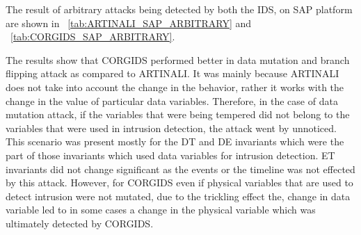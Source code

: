 The result of arbitrary attacks being detected by both the IDS, on SAP platform are shown in ~\autoref{tab:ARTINALI_SAP_ARBITRARY} and ~\autoref{tab:CORGIDS_SAP_ARBITRARY}.

\begin{table}
\centering
  \caption{Results of intrusion detection by ARTINALI for Arbitrary attacks on SAP platform}
  \label{tab:ARTINALI_SAP_ARBITRARY}
\end{table}


\begin{table}
\centering
  \caption{Results of intrusion detection by CORGIDS for Arbitrary attacks on SAP platform}
  \label{tab:CORGIDS_SAP_ARBITRARY}
\end{table}

The results show that CORGIDS performed better in data mutation and branch flipping attack as compared to ARTINALI. It was mainly because ARTINALI does not take into account the change in the behavior, rather it works with the change in the value of particular data variables. Therefore, in the case of data mutation attack, if the variables that were being tempered did not belong to the variables that were used in intrusion detection, the attack went by unnoticed. This scenario was present mostly for the D\textbar T and D\textbar E invariants which were the part of those invariants which used data variables for intrusion detection. E\textbar T invariants did not change significant as the events or the timeline was not effected by this attack. However, for CORGIDS even if physical variables that are used to detect intrusion were not mutated, due to the trickling effect the, change in data variable led to in some cases a change in the physical variable which was ultimately detected by CORGIDS.

